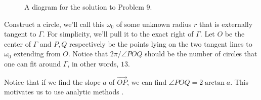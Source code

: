 \begin{enumerate}
\begin{figure}
\begin{minipage}{0.5\textwidth}
            \caption{A diagram for the solution to Problem 9.}
        \end{minipage}
    \end{figure}

    Construct a circle, we'll call this \( \omega_0 \) of some unknown radius
    \( r \) that is externally tangent to \( \Gamma \). For simplicity, we'll
    pull it to the exact right of \( \Gamma \). Let \( O \) be the center of \(
    \Gamma \) and \( P,Q \) respectively be the points lying on the two tangent
    lines to \( \omega_0 \) extending from \( O \). Notice that \( 2 \pi /
    \angle POQ \) should be the number of circles that one can fit around \(
    \Gamma \), in other words, \( 13 \).

    Notice that if we find the slope \( a \) of \( \overrightarrow{OP} \), we
    can find \( \angle POQ = 2 \arctan{a} \). This motivates us to use analytic
    methods . 


\end{enumerate}
